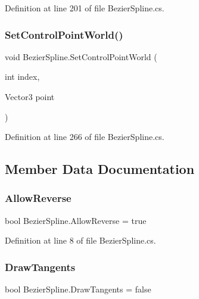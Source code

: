 Definition at line 201 of file Bezier\+Spline.\+cs.

\mbox{\label{class_bezier_spline_a8090492aaedbf221cbc0cb6568674e10}} 
\subsubsection{\texorpdfstring{Set\+Control\+Point\+World()}{SetControlPointWorld()}}
{\footnotesize\ttfamily void Bezier\+Spline.\+Set\+Control\+Point\+World (\begin{DoxyParamCaption}\item[{int}]{index,  }\item[{Vector3}]{point }\end{DoxyParamCaption})}



Definition at line 266 of file Bezier\+Spline.\+cs.



\subsection{Member Data Documentation}
\mbox{\label{class_bezier_spline_a4225d2d179b33b5289878818daa8024e}} 
\subsubsection{\texorpdfstring{Allow\+Reverse}{AllowReverse}}
{\footnotesize\ttfamily bool Bezier\+Spline.\+Allow\+Reverse = true}



Definition at line 8 of file Bezier\+Spline.\+cs.

\mbox{\label{class_bezier_spline_ad2ede07ef29ceb9b8bb226f35a1a66c8}} 
\subsubsection{\texorpdfstring{Draw\+Tangents}{DrawTangents}}
{\footnotesize\ttfamily bool Bezier\+Spline.\+Draw\+Tangents = false}



